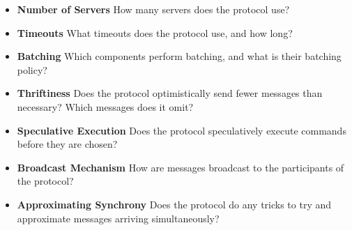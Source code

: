 \begin{itemize}
  \item \textbf{Number of Servers}
    How many servers does the protocol use?

  \item \textbf{Timeouts}
    What timeouts does the protocol use, and how long?

  \item \textbf{Batching}
    Which components perform batching, and what is their batching policy?

  \item \textbf{Thriftiness}
    Does the protocol optimistically send fewer messages than necessary? Which
    messages does it omit?

  \item \textbf{Speculative Execution}
    Does the protocol speculatively execute commands before they are chosen?

  \item \textbf{Broadcast Mechanism}
    How are messages broadcast to the participants of the protocol?

  \item \textbf{Approximating Synchrony}
    Does the protocol do any tricks to try and approximate messages arriving
    simultaneously?
\end{itemize}
